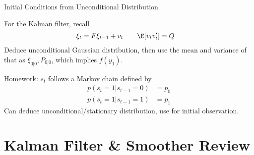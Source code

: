 \documentclass[handout]{beamer}
\begin{document}
\begin{frame}[shrink]{%
    Initial Conditions from Unconditional Distribution
}


For the Kalman filter, recall
\begin{align*}
  \xi_t
  &=
  F\xi_{t-1} + v_t
  \qquad
  \E[v_tv_t']=Q
\end{align*}
Deduce unconditional Gaussian distribution, then use the mean and
variance of that as $\xi_{0|0}, P_{0|0}$, which implies $f(y_1)$.

Homework:
$s_t$ follows a Markov chain defined by
\begin{align*}
  p(s_t=1|s_{t-1}=0)
  &=
  p_0 \\
  p(s_t=1|s_{t-1}=1)
  &=
  p_1
\end{align*}
Can deduce unconditional/stationary distribution, use for initial
observation.


\end{frame}





\section{Kalman Filter \& Smoother Review}
\end{document}
